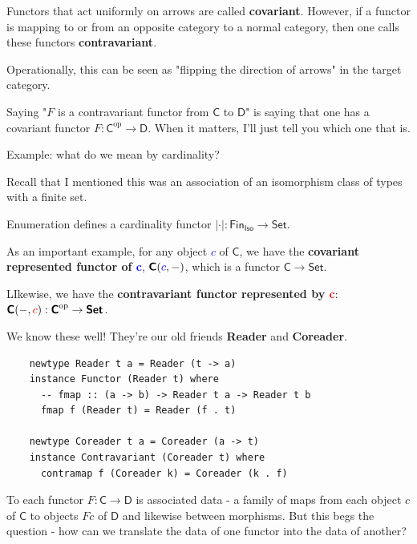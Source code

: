 \documentclass[tikz]{beamer}
\newcommand{\cat}[1]{\bm{ \mathsf{#1} }}
\newcommand{\cc}{\cat{C}}
\newcommand{\dd}{\cat{D}}
\newcommand{\op}[1]{#1^{\text{op}}}
\newcommand{\opc}{\op{\cc}}
\newcommand{\red}[1]{\textcolor{red}{#1}}
\newcommand{\blue}[1]{\textcolor{blue}{#1}}
\newcommand{\mblue}[1]{\textcolor{blue}{$#1$}}
\theoremstyle{definition}
\begin{document}
\frame
{
	Functors that act uniformly on arrows are called \textbf{covariant}. However, if a functor is mapping to or from an opposite category to a normal category, then one calls these functors \textbf{contravariant}.
	
	 Operationally, this can be seen as "flipping the direction of arrows" in the target category. 
}

\frame
{
	Saying "$F$ is a contravariant functor from $\cc$ to $\dd$" is saying that one has a covariant functor $F : \opc \to \dd$. When it matters, I'll just tell you which one that is.

}

\frame
{
	Example: what do we mean by cardinality?
}

\frame
{
	Recall that I mentioned this was an association of an isomorphism class of types with a finite set. 
}

\frame
{
	Enumeration defines a cardinality functor $|\cdot|: \cat{Fin_{Iso}} \to \cat{Set}$.  
}

\frame
{
	As an important example, for any object \mblue{c} of $\cc$, we have the \textbf{covariant represented functor of \blue{c}}, $\cc(\blue{c}, -)$, which is a functor $\cc \to \cat{Set}$.
	
}

\frame
{

 LIkewise, we have the \textbf{contravariant functor represented by \red{c}}: $\cc(-, \red{c}) : \opc \to \cat{Set}$.

}

\frame
{
	We know these well! They're our old friends \textbf{Reader} and \textbf{Coreader}.
}

\begin{frame}[fragile]

	\begin{verbatim}
	newtype Reader t a = Reader (t -> a)
	instance Functor (Reader t) where
	  -- fmap :: (a -> b) -> Reader t a -> Reader t b
	  fmap f (Reader t) = Reader (f . t)
	  
	newtype Coreader t a = Coreader (a -> t)
	instance Contravariant (Coreader t) where
	  contramap f (Coreader k) = Coreader (k . f)
	\end{verbatim}
\end{frame}

\frame
{
	To each functor $F : \cc \to \dd$ is associated data - a family of maps from each object $c$ of $\cc$ to objects $Fc$ of $\dd$ and likewise between morphisms. But this begs the question - how can we translate the data of one functor into the data of another?  
}
\end{document}
